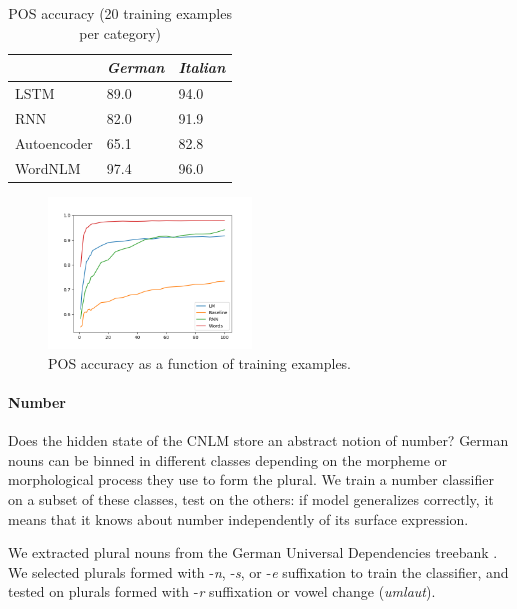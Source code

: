 \begin{table}[t]
  \begin{center}
    \begin{tabular}{l|l|l}
   &\emph{German}&\emph{Italian}\\
      \hline
      LSTM & 89.0 & 94.0 \\
      RNN & 82.0 & 91.9 \\
      Autoencoder & 65.1 & 82.8 \\
      WordNLM & 97.4 & 96.0 \\
    \end{tabular}
  \end{center}
  \caption{\label{tab:pos-results} POS accuracy (20 training examples per category)}
\end{table}


\begin{figure}
\includegraphics[width=0.48\textwidth]{figures/german_pos_nouns_verbs.png}
	\caption{POS accuracy as a function of training examples.}\label{fig:pos-induction}
\end{figure}





\paragraph{Number}
Does the hidden state of the CNLM store an abstract notion of
number?
German nouns can be binned in different classes depending on
the morpheme or morphological process they use to form the plural. We
train a number classifier on a subset of these classes, test on the
others: if model generalizes correctly, it means that it knows about
number independently of its surface expression.

We extracted plural nouns from the German Universal Dependencies treebank \cite{de2006generating,mcdonald2013universal}.
We selected plurals formed with -\emph{n}, -\emph{s}, or -\emph{e} suffixation to train the classifier, and tested on plurals formed with -\emph{r} suffixation or vowel change (\emph{umlaut}).

